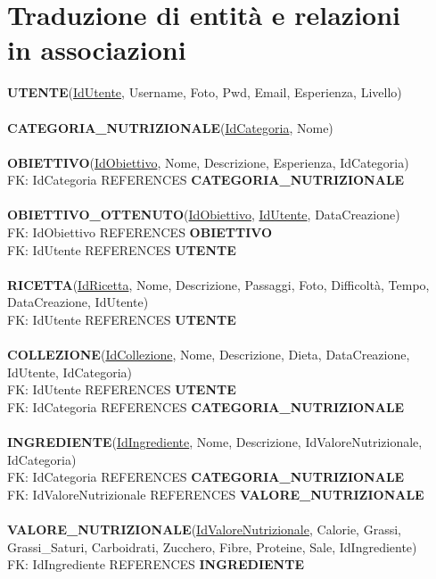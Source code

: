 ﻿\documentclass[a4paper,12pt]{report}
\begin{document}
\section{Traduzione di entità e relazioni\\ in associazioni}
\textbf{UTENTE}(\underline{IdUtente}, Username, Foto, Pwd, Email, Esperienza, Livello)\\\\
\textbf{CATEGORIA\_NUTRIZIONALE}(\underline{IdCategoria}, Nome)\\\\
\textbf{OBIETTIVO}(\underline{IdObiettivo}, Nome, Descrizione, Esperienza, IdCategoria)\\
FK: IdCategoria REFERENCES \textbf{CATEGORIA\_NUTRIZIONALE}\\\\
\textbf{OBIETTIVO\_OTTENUTO}(\underline{IdObiettivo}, \underline{IdUtente}, DataCreazione)\\
FK: IdObiettivo REFERENCES \textbf{OBIETTIVO}\\
FK: IdUtente REFERENCES \textbf{UTENTE}\\\\
\textbf{RICETTA}(\underline{IdRicetta}, Nome, Descrizione, Passaggi, Foto, Difficoltà, Tempo, DataCreazione, IdUtente)\\
FK: IdUtente REFERENCES \textbf{UTENTE}\\\\
\textbf{COLLEZIONE}(\underline{IdCollezione}, Nome, Descrizione, Dieta, DataCreazione, IdUtente, IdCategoria)\\
FK: IdUtente REFERENCES \textbf{UTENTE}\\
FK: IdCategoria REFERENCES \textbf{CATEGORIA\_NUTRIZIONALE}\\\\
\textbf{INGREDIENTE}(\underline{IdIngrediente}, Nome, Descrizione, IdValoreNutrizionale, IdCategoria)\\
FK: IdCategoria REFERENCES \textbf{CATEGORIA\_NUTRIZIONALE}\\
FK: IdValoreNutrizionale REFERENCES \textbf{VALORE\_NUTRIZIONALE}\\\\
\textbf{VALORE\_NUTRIZIONALE}(\underline{IdValoreNutrizionale}, Calorie, Grassi,\\ Grassi\_Saturi, Carboidrati, Zucchero, Fibre, Proteine, Sale, IdIngrediente)\\
FK: IdIngrediente REFERENCES \textbf{INGREDIENTE}\\\\
\end{document}
